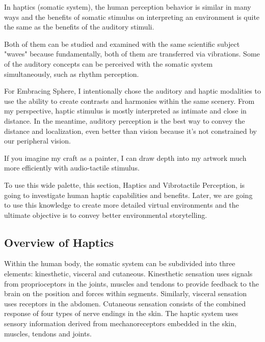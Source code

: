         In haptics (somatic system), the human perception behavior is similar in many ways and the benefits of somatic stimulus on interpreting an environment is quite the same as the benefits of the auditory stimuli\cite{Haptic_Perception-A_Tutorial}.\par

        Both of them can be studied and examined with the same scientific subject "waves" because fundamentally, both of them are transferred via vibrations\cite{Human_Response_to_Vibration}. Some of the auditory concepts can be perceived with the somatic system simultaneously, such as rhythm perception\cite{Consonance_of_Vibrotactile_Chords}\cite{Composing_Vibrotactile_Music}.\par

        For Embracing Sphere, I intentionally chose the auditory and haptic modalities to use the ability to create contrasts and harmonies within the same scenery. From my perspective, haptic stimulus is mostly interpreted as intimate and close in distance. In the meantime, auditory perception is the best way to convey the distance and localization, even better than vision because it's not constrained by our peripheral vision.\par

        If you imagine my craft as a painter, I can draw depth into my artwork much more efficiently with audio-tactile stimulus.\par

        To use this wide palette, this section, Haptics and Vibrotactile Perception, is going to investigate human haptic capabilities and benefits. Later, we are going to use this knowledge to create more detailed virtual environments and the ultimate objective is to convey better environmental storytelling.\par
        \subsection{Overview of Haptics}
            Within the human body, the somatic system can be subdivided into three elements: kinesthetic, visceral and cutaneous. Kinesthetic sensation uses signals from proprioceptors in the joints, muscles and tendons to provide feedback to the brain on the position and forces within segments. Similarly, visceral sensation uses receptors in the abdomen. Cutaneous sensation consists of the combined response of four types of nerve endings in the skin\cite{Human_Response_to_Vibration}. The haptic system uses sensory information derived from mechanoreceptors embedded in the skin, muscles, tendons and joints\cite{Haptic_Perception-A_Tutorial}.\par

